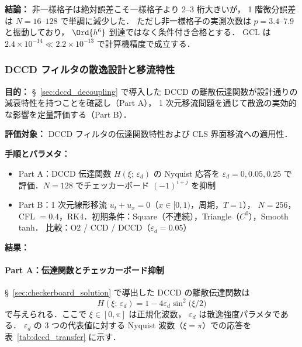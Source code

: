 \noindent\textbf{結論：}
非一様格子は絶対誤差こそ一様格子より 2--3 桁大きいが，
1 階微分誤差は $N=16$--$128$ で単調に減少した．
ただし非一様格子の実測次数は $p = 3.4$--$7.9$ と振動しており，
$\Ord{h^6}$ 到達ではなく条件付き合格とする．
GCL は $2.4 \times 10^{-14} \ll 2.2 \times 10^{-13}$ で計算機精度で成立する．

\subsubsection{DCCD フィルタの散逸設計と移流特性}
\label{sec:verify_dccd_dissipation}
\label{sec:dccd_dissipation_bench}

\noindent\textbf{目的：}
§~\ref{sec:dccd_decoupling} で導入した DCCD の離散伝達関数が設計通りの
減衰特性を持つことを確認し（Part A），
1 次元移流問題を通じて散逸の実効的な影響を定量評価する（Part B）．

\noindent\textbf{評価対象：}
DCCD フィルタの伝達関数特性および CLS 界面移流への適用性．

\noindent\textbf{手順とパラメタ：}
\begin{itemize}[noitemsep]
  \item Part A：DCCD 伝達関数 $H(\xi;\,\varepsilon_d)$ の Nyquist 応答を
        $\varepsilon_d = 0, 0.05, 0.25$ で評価．$N = 128$ でチェッカーボード $(-1)^{i+j}$ を抑制
  \item Part B：1 次元線形移流 $u_t + u_x = 0$（$x \in [0,1)$，周期，$T = 1$），
        $N = 256$，CFL $= 0.4$，RK4．初期条件：Square（不連続），Triangle（$C^0$），Smooth tanh．
        比較：O2 / CCD / DCCD（$\varepsilon_d = 0.05$）
\end{itemize}

\noindent\textbf{結果：}

\paragraph{Part A：伝達関数とチェッカーボード抑制}
§~\ref{sec:checkerboard_solution} で導出した DCCD の離散伝達関数は
\begin{equation}
  H(\xi;\,\varepsilon_d) = 1 - 4\varepsilon_d \sin^2\!\bigl(\xi/2\bigr)
  \label{eq:dccd_transfer_verify}
\end{equation}
で与えられる．ここで $\xi \in [0,\pi]$ は正規化波数，
$\varepsilon_d$ は散逸強度パラメタである．
$\varepsilon_d$ の 3 つの代表値に対する Nyquist 波数（$\xi = \pi$）での応答を表~\ref{tab:dccd_transfer} に示す．

